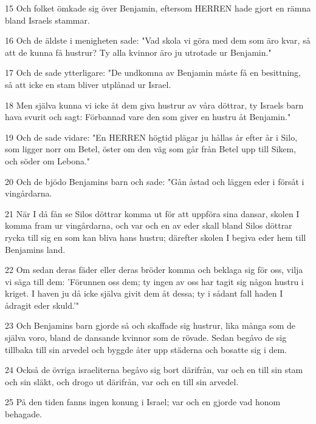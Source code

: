 \par 15 Och folket ömkade sig över Benjamin, eftersom HERREN hade gjort en rämna bland Israels stammar.
\par 16 Och de äldste i menigheten sade: "Vad skola vi göra med dem som äro kvar, så att de kunna få hustrur? Ty alla kvinnor äro ju utrotade ur Benjamin."
\par 17 Och de sade ytterligare: "De undkomna av Benjamin måste få en besittning, så att icke en stam bliver utplånad ur Israel.
\par 18 Men själva kunna vi icke åt dem giva hustrur av våra döttrar, ty Israels barn hava svurit och sagt: Förbannad vare den som giver en hustru åt Benjamin."
\par 19 Och de sade vidare: "En HERREN högtid plägar ju hållas år efter år i Silo, som ligger norr om Betel, öster om den väg som går från Betel upp till Sikem, och söder om Lebona."
\par 20 Och de bjödo Benjamins barn och sade: "Gån åstad och läggen eder i försåt i vingårdarna.
\par 21 När I då fån se Silos döttrar komma ut för att uppföra sina dansar, skolen I komma fram ur vingårdarna, och var och en av eder skall bland Silos döttrar rycka till sig en som kan bliva hans hustru; därefter skolen I begiva eder hem till Benjamins land.
\par 22 Om sedan deras fäder eller deras bröder komma och beklaga sig för oss, vilja vi säga till dem: 'Förunnen oss dem; ty ingen av oss har tagit sig någon hustru i kriget. I haven ju då icke själva givit dem åt dessa; ty i sådant fall haden I ådragit eder skuld.'"
\par 23 Och Benjamins barn gjorde så och skaffade sig hustrur, lika många som de själva voro, bland de dansande kvinnor som de rövade. Sedan begåvo de sig tillbaka till sin arvedel och byggde åter upp städerna och bosatte sig i dem.
\par 24 Också de övriga israeliterna begåvo sig bort därifrån, var och en till sin stam och sin släkt, och drogo ut därifrån, var och en till sin arvedel.
\par 25 På den tiden fanns ingen konung i Israel; var och en gjorde vad honom behagade.


